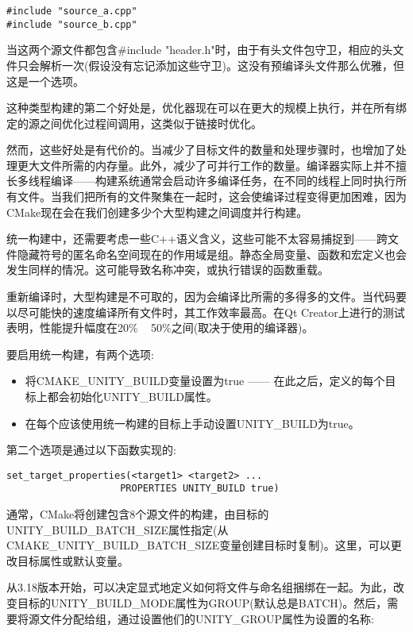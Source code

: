 \begin{lstlisting}[style=styleCXX]
#include "source_a.cpp"
#include "source_b.cpp"
\end{lstlisting}

当这两个源文件都包含\#include "header.h"时，由于有头文件包守卫，相应的头文件只会解析一次(假设没有忘记添加这些守卫)。这没有预编译头文件那么优雅，但这是一个选项。

这种类型构建的第二个好处是，优化器现在可以在更大的规模上执行，并在所有绑定的源之间优化过程间调用，这类似于链接时优化。

然而，这些好处是有代价的。当减少了目标文件的数量和处理步骤时，也增加了处理更大文件所需的内存量。此外，减少了可并行工作的数量。编译器实际上并不擅长多线程编译——构建系统通常会启动许多编译任务，在不同的线程上同时执行所有文件。当我们把所有的文件聚集在一起时，这会使编译过程变得更加困难，因为CMake现在会在我们创建多少个大型构建之间调度并行构建。

统一构建中，还需要考虑一些C++语义含义，这些可能不太容易捕捉到——跨文件隐藏符号的匿名命名空间现在的作用域是组。静态全局变量、函数和宏定义也会发生同样的情况。这可能导致名称冲突，或执行错误的函数重载。

重新编译时，大型构建是不可取的，因为会编译比所需的多得多的文件。当代码要以尽可能快的速度编译所有文件时，其工作效率最高。在Qt Creator上进行的测试表明，性能提升幅度在20\% ~ 50\%之间(取决于使用的编译器)。

要启用统一构建，有两个选项:

\begin{itemize}
\item 
将CMAKE\_UNITY\_BUILD变量设置为true —— 在此之后，定义的每个目标上都会初始化UNITY\_BUILD属性。

\item 
在每个应该使用统一构建的目标上手动设置UNITY\_BUILD为true。
\end{itemize}

第二个选项是通过以下函数实现的:

\begin{lstlisting}[style=styleCMake]
set_target_properties(<target1> <target2> ...
					PROPERTIES UNITY_BUILD true)
\end{lstlisting}

通常，CMake将创建包含8个源文件的构建，由目标的UNITY\_BUILD\_BATCH\_SIZE属性指定(从CMAKE\_UNITY\_BUILD\_BATCH\_SIZE变量创建目标时复制)。这里，可以更改目标属性或默认变量。

从3.18版本开始，可以决定显式地定义如何将文件与命名组捆绑在一起。为此，改变目标的UNITY\_BUILD\_MODE属性为GROUP(默认总是BATCH)。然后，需要将源文件分配给组，通过设置他们的UNITY\_GROUP属性为设置的名称:

